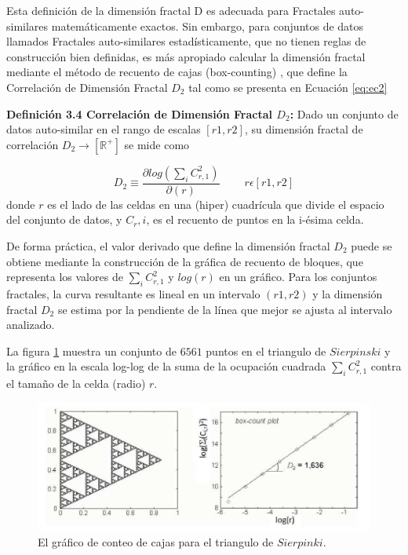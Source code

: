 Esta definición de la dimensión fractal D es adecuada para Fractales  auto-similares matemáticamente  exactos. Sin embargo, para conjuntos de datos llamados  Fractales auto-similares estadísticamente, que no tienen reglas de construcción bien definidas, es más apropiado  calcular la dimensión fractal mediante el método de recuento de cajas (box-counting) \cite{Schroeder:1991}, que define la Correlación de Dimensión Fractal   $D_2$ tal como se presenta en Ecuación \ref{eq:ec2}

\textbf{Definición 3.4 Correlación de Dimensión Fractal $D_2$:} Dado un conjunto de datos auto-similar en el rango de escalas $[r1, r2]$, su dimensión fractal de correlación $D_2 \rightarrow \left[ \mathbb{R}^{+} \right]$ se mide como

\begin{equation}
D_2 \equiv  \frac{\partial log (\sum_i C_{r,1}^2)}{\partial (r)} \qquad \:r \epsilon [r1,r2 ]
\label{eq:ec2}
\end{equation}
donde $r$ es el lado de las celdas en una (hiper) cuadrícula  que divide el espacio del  conjunto de datos, y $C_r,i$, es el recuento de puntos en la i-ésima celda.

De forma práctica, el valor derivado que define la dimensión fractal $D_2$ puede se obtiene mediante la construcción de la gráfica de recuento de bloques, que representa los valores de $\sum_i C_{r,1}^2$  y $log (r)$ en un gráfico. Para los conjuntos fractales, la curva resultante es lineal en un intervalo $(r1, r2)$ y la dimensión fractal $D_2$ se estima por la pendiente de la línea que mejor se ajusta al intervalo analizado.

La figura \ref{fig:ima4} muestra un conjunto de $6561$ puntos en el triangulo de $Sierpinski$  y la gráfico en la escala log-log de la suma de la ocupación cuadrada $\sum_i C_{r,1}^2$ contra el tamaño de la celda  (radio) $r$.

\begin{figure}[h]
\centering
\includegraphics[scale=1.4]{chapter4/ima4.png}
\caption{El gráfico de conteo de cajas para el triangulo de $Sierpinki$.}
\label{fig:ima4}
\end{figure}


